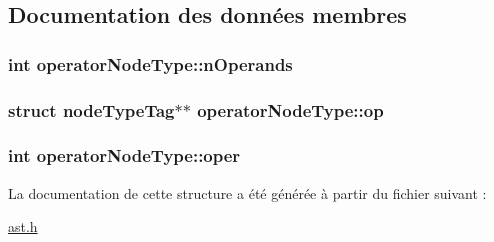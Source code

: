 \subsection{Documentation des données membres}
\hypertarget{structoperatorNodeType_ae8cc53d6858ad29d7e9b752dfedcb337}{
\subsubsection[{n\-Operands}]{\setlength{\rightskip}{0pt plus 5cm}int operator\-Node\-Type\-::n\-Operands}}\label{structoperatorNodeType_ae8cc53d6858ad29d7e9b752dfedcb337}
\hypertarget{structoperatorNodeType_a013fd17268cc141ff89efff6790775a5}{
\subsubsection[{op}]{\setlength{\rightskip}{0pt plus 5cm}struct {\bf node\-Type\-Tag}$\ast$$\ast$ operator\-Node\-Type\-::op}}\label{structoperatorNodeType_a013fd17268cc141ff89efff6790775a5}
\hypertarget{structoperatorNodeType_ae2b6d5eb95990c8356dd3dafe46f09b1}{
\subsubsection[{oper}]{\setlength{\rightskip}{0pt plus 5cm}int operator\-Node\-Type\-::oper}}\label{structoperatorNodeType_ae2b6d5eb95990c8356dd3dafe46f09b1}


La documentation de cette structure a été générée à partir du fichier suivant \-:\begin{DoxyCompactItemize}
\item 
\hyperlink{ast_8h}{ast.\-h}\end{DoxyCompactItemize}
